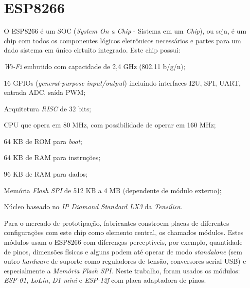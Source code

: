 
\section{ESP8266}
\label{sec:ESP8266}

O ESP8266 é um SOC (\emph{System On a Chip} - Sistema em um \emph{Chip}),
ou seja, é um chip com todos os componentes lógicos
eletrônicos necessários e partes para um dado sistema em único cirtuito
integrado. Este chip possui:


\begin{alineas}
	\item \emph{Wi-Fi} embutido com capacidade de 2,4 GHz (802.11 b/g/n);

	\item 16 GPIOs (\emph{general-purpose input/output}) incluindo interfaces
 I2U, SPI, UART, entrada ADC, saída PWM;

	\item Arquitetura \emph{RISC} de 32 bits;

	\item CPU que opera em  80 MHz, com possibilidade de operar em 160 MHz;

	\item 64 KB de ROM para \emph{boot};

	\item 64 KB de RAM para instruções;

	\item 96 KB de RAM para dados;

	\item Memória \emph{Flash SPI} de 512 KB a 4 MB (dependente de módulo externo);

	\item Núcleo baseado no \emph{IP Diamand Standard LX3} da \emph{Tensilica}.

\end{alineas}

Para o mercado de prototipação, fabricantes constroem placas de diferentes configurações com
este chip como elemento central, os chamados módulos. Estes módulos usam o
ESP8266 com diferenças perceptíveis, por exemplo, quantidade de pinos, dimensões
físicas e alguns podem até operar de modo \emph{standalone} (sem outro \emph{hardware} de
suporte como reguladores de tensão, conversores serial-USB) e especialmente a
 \emph{Memória Flash SPI}. Neste trabalho, foram usados os módulos:
\emph{ESP-01}, \emph{LoLin}, \emph{D1 mini} e \emph{ESP-12f} com placa adaptadora de pinos.


